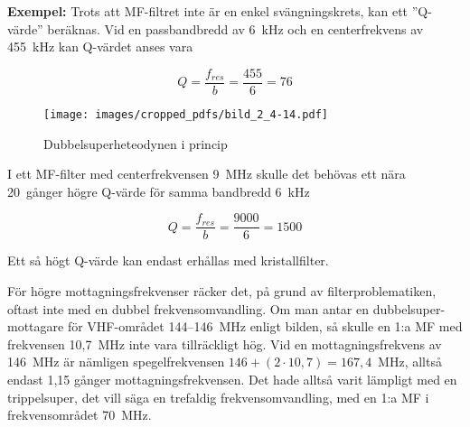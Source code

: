 \textbf{Exempel:}
Trots att MF-filtret inte är en enkel svängningskrets, kan ett ''Q-värde''
beräknas.
Vid en passbandbredd av 6~kHz och en centerfrekvens av 455~kHz kan Q-värdet
anses vara

\[ Q = \frac{f_{res}}{b} = \frac{455}{6} = 76 \]

\begin{figure}
  \texttt{[image: images/cropped\_pdfs/bild\_2\_4-14.pdf]}
  \caption{Dubbelsuperheteodynen i princip}
  \label{fig:bildII4-14}
\end{figure}

I ett MF-filter med centerfrekvensen 9~MHz skulle det behövas ett nära
20~gånger högre Q-värde för samma bandbredd 6~kHz

\[ Q = \frac{f_{res}}{b} = \frac{9000}{6} = 1500 \]

Ett så högt Q-värde kan endast erhållas med kristallfilter.

För högre mottagningsfrekvenser räcker det, på grund av filterproblematiken,
oftast inte med en dubbel frekvensomvandling.
Om man antar en dubbelsuper-mottagare för VHF-området 144--146~MHz enligt
bilden, så skulle en 1:a MF med frekvensen 10,7~MHz inte vara tillräckligt hög.
Vid en mottagningsfrekvens av 146~MHz är nämligen spegelfrekvensen
\(146 + (2 \cdot 10,7) = 167,4\)~MHz, alltså endast 1,15 gånger
mottagningsfrekvensen.
Det hade alltså varit lämpligt med en trippelsuper, det vill säga en trefaldig
frekvensomvandling, med en 1:a MF i frekvensområdet 70~MHz.
